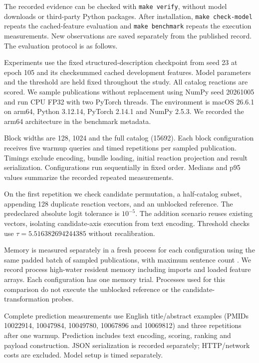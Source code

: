 \documentclass[preprint,12pt,a4paper]{elsarticle}
\begin{document}
The recorded evidence can be checked with \texttt{make verify}, without model
downloads or third-party Python packages. After installation, \texttt{make
check-model} repeats the cached-feature evaluation and \texttt{make benchmark}
repeats the execution measurements. New observations are saved separately from
the published record. The evaluation protocol is as follows.

Experiments use the fixed structured-description checkpoint from seed 23 at epoch
105 and its checksummed cached development features. Model parameters and the
threshold are held fixed throughout the study.
All \CatalogCount{} catalog reactions are scored. We sample \SampleCount{} publications
without replacement using NumPy seed 20261005 and run CPU FP32 with two PyTorch
threads. The environment is macOS 26.6.1 on arm64, Python 3.12.14, PyTorch 2.14.1
and NumPy 2.5.3. We recorded the arm64 architecture in the benchmark metadata.

Block widths are 128, 1024 and the full catalog (15692).
Each block configuration receives five warmup queries and \RepeatCount{} timed repetitions
per sampled publication. Timings exclude encoding, bundle loading, initial
reaction projection and result serialization. Configurations run sequentially in
fixed order. Medians and p95 values summarize the recorded repeated measurements.

On the first repetition we check candidate permutation, a half-catalog subset,
appending 128 duplicate reaction vectors, and an unblocked reference. The
predeclared absolute logit tolerance is $10^{-5}$. The addition scenario reuses existing vectors, isolating candidate-axis
execution from text encoding. Threshold checks use $\tau=5.516382694244385$
without recalibration.

Memory is measured separately in a fresh process for each configuration using
the same padded batch of \MemoryBatch{} sampled publications, with maximum sentence count \MemorySpans{}.
We record process high-water resident memory including imports and loaded feature
arrays. Each configuration has one memory trial. Processes used for this comparison do not execute the
unblocked reference or the candidate-transformation probes.

Complete prediction measurements use \EndExamples{} English title/abstract
examples (PMIDs 10022914, 10047984, 10049780, 10067896 and 10069812) and three
repetitions after one warmup. Prediction includes text
encoding, scoring, ranking and payload construction. JSON serialization is recorded
separately; HTTP/network costs are excluded. Model setup is timed separately.
\end{document}
